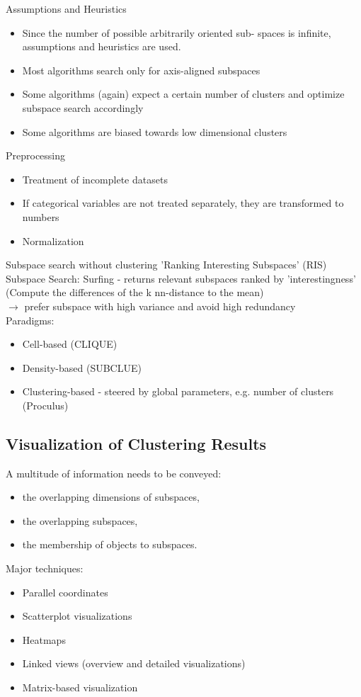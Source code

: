 \documentclass[11pt,ngerman]{article}
\begin{document}
Assumptions and Heuristics
\begin{itemize}
\item Since the number of possible arbitrarily oriented sub-
spaces is infinite, assumptions and heuristics are
used.
\item Most algorithms search only for axis-aligned
subspaces
\item Some algorithms (again) expect a certain number of
clusters and optimize subspace search accordingly
\item Some algorithms are biased towards low
dimensional clusters
\end{itemize}

Preprocessing
\begin{itemize}
\item Treatment of incomplete datasets
\item If categorical variables are not treated separately, they are
transformed to numbers
\item Normalization
\end{itemize}

Subspace search without clustering
'Ranking Interesting Subspaces' (RIS)
Subspace Search: Surfing - returns relevant subspaces ranked by
'interestingness' (Compute the differences of the k nn-distance to the mean)\\
$\rightarrow$ prefer subspace with high variance and avoid high redundancy\\

Paradigms:
\begin{itemize}
	\item Cell-based (CLIQUE)
	\item Density-based (SUBCLUE)
	\item Clustering-based - steered by global parameters, e.g. number of clusters (Proculus)
\end{itemize}

\subsection{ Visualization of Clustering Results}
A multitude of information needs to be conveyed:
\begin{itemize}
\item the overlapping dimensions of subspaces,
\item the overlapping subspaces,
\item the membership of objects to subspaces.
\end{itemize}
Major techniques:
\begin{itemize}
\item Parallel coordinates
\item Scatterplot visualizations
\item Heatmaps
\item Linked views (overview and detailed visualizations)
\item Matrix-based visualization
\end{itemize}
\end{document}
